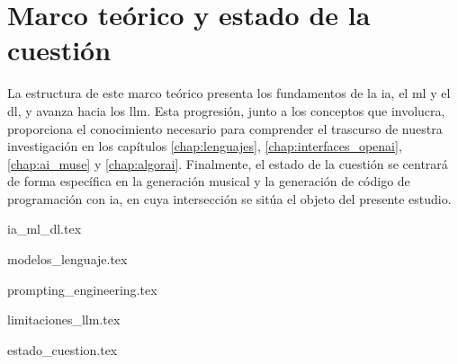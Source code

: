 \chapter{Marco teórico y estado de la cuestión}


La estructura de este marco teórico presenta los fundamentos de la \gls{ia}, el \gls{ml} y el \gls{dl}, y avanza hacia los \gls{llm}. Esta progresión, junto a los conceptos que involucra, proporciona el conocimiento necesario para comprender el trascurso de nuestra investigación en los capítulos \ref{chap:lenguajes}, \ref{chap:interfaces_openai}, \ref{chap:ai_muse} y \ref{chap:algorai}. Finalmente, el estado de la cuestión se centrará de forma específica en la generación musical y la generación de código de programación con \gls{ia}, en cuya intersección se sitúa el objeto del presente estudio.


{ia_ml_dl.tex}

{modelos_lenguaje.tex}

{prompting_engineering.tex}

{limitaciones_llm.tex}

{estado_cuestion.tex} 







